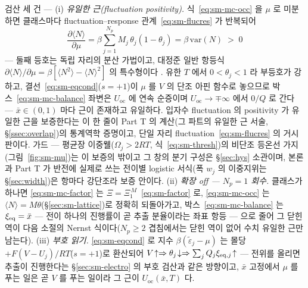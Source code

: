 \begin{verifybox}
검산 세 건 --- (i) \emph{유일한 근(fluctuation positivity).} 식~\eqref{eq:sm-mc-occ} 을 $\mu$ 로 미분하면 클래스마다
fluctuation--response 관계~\eqref{eq:sm-flucres} 가 반복되어
\begin{equation}
\frac{\partial\langle N\rangle}{\partial\mu}
=\beta\sum_{j=1}^{N_p}M_j\,\theta_j(1-\theta_j)
=\beta\,\mathrm{var}(N)\;>\;0
\label{eq:sm-mc-fluc}
\end{equation}
--- 둘째 등호는 독립 자리의 분산 가법이고, 대정준 일반 항등식
$\partial\langle N\rangle/\partial\mu=\beta[\langle N^2\rangle-\langle N\rangle^2]$ 의 특수형이다
\cite{mcquarrie1976}. 유한 $T$ 에서 $0<\theta_j<1$ 라 부등호가 강하고, 결선~\eqref{eq:sm-eqcond}($s{=}+1$)이
$\mu$ 를 $V$ 의 단조 아핀 함수로 놓으므로 박스~\eqref{eq:sm-mc-balance} 좌변은 $U_\mathrm{oc}$ 에 연속
순증이며 $U_\mathrm{oc}\to\mp\infty$ 에서 $0/Q$ 로 간다 --- $\bar x\in(0,1)$ 마다 근이 존재하고 유일하다.
입자수 fluctuation 의 positivity 가 유일한 근을 보증한다는 이 한 줄이 Part T 의 계산(그 파트의 유일한 근 서술, \S\ref{ssec:overlap})의 통계역학
증명이고, 단일 자리 fluctuation~\eqref{eq:sm-flucres} 의 거시판이다. 가드 --- 평균장 이중웰($\Omega_j>2RT$,
식~\eqref{eq:sm-thresh})의 비단조 등온선 가지(그림~\ref{fig:sm-mu})는 이 보증의 밖이고 그 창의 분기 구성은
\S\ref{sec:hys} 소관이며, 본론과 Part T 가 반전에 실제로 쓰는 전이별 logistic 서식(폭 $w_j$ 의 이중지위는
\S\ref{sec:width})은 항마다 강단조라 보증 안이다. (ii) \emph{확장 off --- $N_p=1$ 회수.} 클래스가 하나면
\eqref{eq:sm-mc-factor} 는 $\Xi=\Xi_1^{\,M}$~\eqref{eq:sm-factor} 로, \eqref{eq:sm-mc-occ} 는
$\langle N\rangle=M\theta$(\S\ref{sec:sm-lattice})로 정확히 되돌아가고, 박스~\eqref{eq:sm-mc-balance} 는
$\xi_{\mathrm{eq}}=\bar x$ --- 전이 하나의 진행률이 곧 추출 분율이라는 좌표 항등 --- 으로 줄어 그 닫힌 역이 다음 소절의
Nernst 식이다($N_p\ge2$ 겹침에서는 닫힌 역이 없어 수치 유일한 근만 남는다). (iii) \emph{부호 읽기.}
\eqref{eq:sm-eqcond} 로 지수 $\beta(\tilde\varepsilon_j-\mu)$ 는 몰당 $+F(V-U_j)/RT$($s{=}+1$)로 환산되어
$V\!\uparrow\Rightarrow\theta_j\!\downarrow\Rightarrow\sum_jQ_j\xi_{\mathrm{eq},j}\!\uparrow$ --- 전위를 올리면 추출이
진행한다는 \S\ref{sec:sm-electro} 의 부호 검산과 같은 방향이고, $\bar x$ 고정에서 $\mu$ 를 푸는 일은 곧 $V$
를 푸는 일이라 그 근이 $U_\mathrm{oc}(\bar x,T)$ 다.
\end{verifybox}

